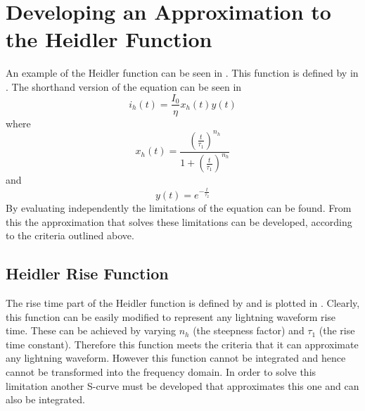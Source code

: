 \section{Developing an Approximation to the Heidler Function}
\label{sec:developing_approximation}
An example of the Heidler function can be seen in . This function is defined by  in .
The shorthand version of the equation can be seen in 
\begin{equation}
i_h \left( t \right) = \frac{I_0}{\eta} x_h \left( t \right) y \left( t \right)
\label{eqn:HFsmall}
\end{equation}
where
\begin{equation}
    x_h \left( t \right) = \frac{{\left (\frac{t}{\tau_1} \right )}^{n_h}}{1 + {\left (\frac{t}{\tau_1} \right )}^{n_h}}
    \label{eqn:HFrise}
\end{equation}
and
\begin{equation}
    y \left( t \right) = e^{-\frac{t}{\tau_2}}
    \label{eqn:HFfall}
\end{equation}
By evaluating  independently the limitations of the equation can be found. From this the approximation that solves these limitations can be developed, according to the criteria outlined above.

\subsection{Heidler Rise Function}
\label{sub:approx_heidler_rise_function}

The rise time part of the Heidler function is defined by  and is plotted in . Clearly, this function can be easily modified to represent any lightning waveform rise time. These can be achieved by varying $n_h$ (the steepness factor) and $\tau_1$ (the rise time constant). Therefore this function meets the criteria that it can approximate any lightning waveform. However this function cannot be integrated and hence cannot be transformed into the frequency domain. In order to solve this limitation another S-curve must be developed that approximates this one and can also be integrated.

